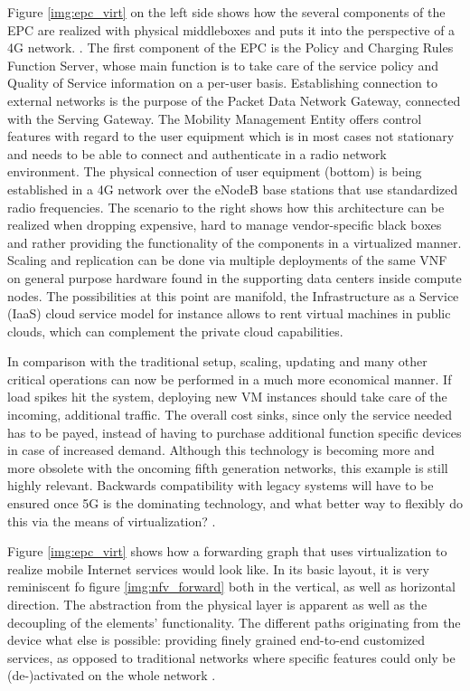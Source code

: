 Figure \ref{img:epc_virt} on the left side shows how the several components of the EPC are realized with physical middleboxes and puts it into the perspective of a 4G network. . The first component of the EPC is the Policy and Charging Rules Function Server, whose main function is to take care of the service policy and Quality of Service information on a per-user basis. Establishing connection to external networks is the purpose of the Packet Data Network Gateway, connected with the Serving Gateway. The Mobility Management Entity offers control features with regard to the user equipment which is in most cases not stationary and needs to be able to connect and authenticate in a radio network environment. The physical connection of user equipment (bottom) is being established in a 4G network over the eNodeB base stations that use standardized radio frequencies.
The scenario to the right shows how this architecture can be realized when dropping expensive, hard to manage vendor-specific black boxes and rather providing the functionality of the components in a virtualized manner. Scaling and replication can be done via multiple deployments of the same VNF on general purpose hardware found in the supporting data centers inside compute nodes. The possibilities at this point are manifold, the Infrastructure as a Service (IaaS) cloud service model for instance allows to rent virtual machines in public clouds, which can complement the private cloud capabilities. 

In comparison with the traditional setup, scaling, updating and many other critical operations can now be performed in a much more economical manner. If load spikes hit the system, deploying new VM instances should take care of the incoming, additional traffic. The overall cost sinks, since only the service needed has to be payed, instead of having to purchase additional function specific devices in case of increased demand. Although this technology is becoming more and more obsolete with the oncoming fifth generation networks, this example is still highly relevant. Backwards compatibility with legacy systems will have to be ensured once 5G is the dominating technology, and what better way to flexibly do this via the means of virtualization? \cite{4g} \cite{mijumbi2016network}. 

Figure \ref{img:epc_virt} shows how a forwarding graph that uses virtualization to realize mobile Internet services would look like. In its basic layout, it is very reminiscent fo figure \ref{img:nfv_forward} both in the vertical, as well as horizontal direction. The abstraction from the physical layer is apparent as well as the decoupling of the elements' functionality. The different paths originating from the device what else is possible: providing finely grained end-to-end customized services, as opposed to traditional networks where specific features could only be (de-)activated on the whole network  \cite{abdelwahab2016network}.

